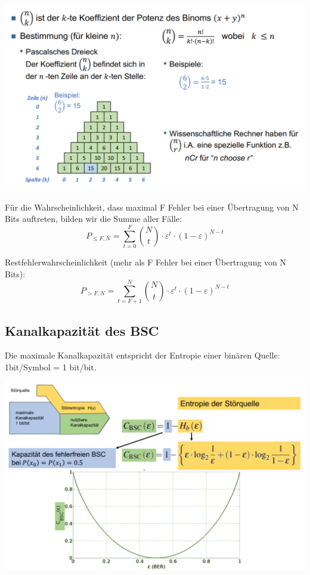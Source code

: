 \begin{center}
    \includegraphics[width=1\linewidth]{images/binominalcoefficient.png}
\end{center}

Für die Wahrscheinlichkeit, dass maximal F Fehler bei einer Übertragung von N Bits auftreten, bilden wir die Summe aller Fälle:
\[
    P_{\leq F, N} = \sum^{F}_{t=0}\binom{N}{t} \cdot \varepsilon^t \cdot (1-\varepsilon)^{N-t}
\]

Restfehlerwahrscheinlichkeit (mehr als F Fehler bei einer Übertragung von N Bits):
\[
    P_{>F,N}=\sum^{N}_{t=F+1}\binom{N}{t} \cdot \varepsilon^t \cdot (1-\varepsilon)^{N-t}
\]

\subsection{Kanalkapazität des BSC}%

Die maximale Kanalkapazität entspricht der Entropie einer binären Quelle: 1bit/Symbol = 1 bit/bit.

\begin{center}
    \includegraphics[width=1\linewidth]{images/kanalkapazitaet.png}
\end{center}

